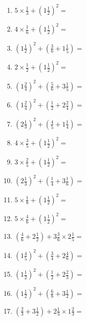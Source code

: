 \documentclass[12pt]{article}
\begin{document}
\begin{enumerate}
\item \large $ 5 \times \frac{1}{3} + (1 \frac{1}{2})^2 = $ \vspace{1.8cm}
\item \large $ 4 \times \frac{1}{6} + (1 \frac{1}{2})^2 = $ \vspace{1.8cm}
\item \large $ (1 \frac{1}{2})^2 + (\frac{3}{6} + 1 \frac{1}{5}) = $ \vspace{1.8cm}
\item \large $ 2 \times \frac{1}{2} + (1 \frac{1}{2})^2 = $ \vspace{1.8cm}
\newpage
\item \large $ (1 \frac{2}{4})^2 + (\frac{5}{6} + 3 \frac{1}{5}) = $ \vspace{1.8cm}
\item \large $ (1 \frac{2}{4})^2 + (\frac{1}{2} + 2 \frac{2}{4}) = $ \vspace{1.8cm}
\item \large $ (2 \frac{1}{3})^2 + (\frac{4}{5} + 1 \frac{1}{4}) = $ \vspace{1.8cm}
\item \large $ 4 \times \frac{3}{5} + (1 \frac{1}{2})^2 = $ \vspace{1.8cm}
\item \large $ 3 \times \frac{2}{5} + (1 \frac{1}{2})^2 = $ \vspace{1.8cm}
\item \large $ (2 \frac{1}{3})^2 + (\frac{1}{4} + 3 \frac{1}{6}) = $ \vspace{1.8cm}
\item \large $ 5 \times \frac{1}{8} + (1 \frac{1}{2})^2 = $ \vspace{1.8cm}
\item \large $ 5 \times \frac{4}{6} + (1 \frac{1}{2})^2 = $ \vspace{1.8cm}
\item \large $ (\frac{4}{6} + 2 \frac{1}{2}) + 3 \frac{3}{6} \times 2 \frac{1}{5} = $ \vspace{1.8cm}
\item \large $ (1 \frac{4}{5})^2 + (\frac{3}{4} + 2 \frac{4}{6}) = $ \vspace{1.8cm}
\newpage
\item \large $ (1 \frac{1}{2})^2 + (\frac{1}{2} + 2 \frac{2}{3}) = $ \vspace{1.8cm}
\item \large $ (1 \frac{1}{2})^2 + (\frac{6}{8} + 3 \frac{1}{2}) = $ \vspace{1.8cm}
\item \large $ (\frac{2}{3} + 3 \frac{1}{2}) + 2 \frac{1}{3} \times 1 \frac{2}{3} = $ \vspace{1.8cm}

\end{enumerate}
\end{document}
